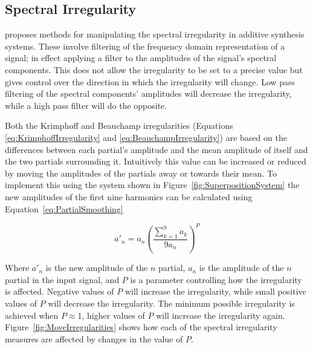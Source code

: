 	\subsection{Spectral Irregularity}
	\label{sec:FeatureControl-Parameterisation-Irregularity}
		\citet{beauchamp2007analysis} proposes methods for manipulating the spectral irregularity in additive
		synthesis systems. These involve filtering of the frequency domain representation of a signal; in effect
		applying a filter to the amplitudes of the signal's spectral components. This does not allow the
		irregularity to be set to a precise value but gives control over the direction in which the irregularity
		will change. Low pass filtering of the spectral components' amplitudes will decrease the irregularity,
		while a high pass filter will do the opposite.
		
		Both the Krimphoff and Beauchamp irregularities (Equations \ref{eq:KrimphoffIrregularity} and
		\ref{eq:BeauchampIrregularity}) are based on the differences between each partial's amplitude and the mean
		amplitude of itself and the two partials surrounding it. Intuitively this value can be increased or reduced
		by moving the amplitudes of the partials away or towards their mean. To implement this using the system
		shown in Figure~\ref{fig:SuperpositionSystem} the new amplitudes of the first nine harmonics can be
		calculated using Equation~\ref{eq:PartialSmoothing}

		\begin{equation}
			a'_{n} = a_{n} \left( \frac{\sum_{k = 1}^{9} a_{k}}{9a_{n}} \right) ^{P}
			\label{eq:PartialSmoothing}
		\end{equation}

		Where $a'_{n}$ is the new amplitude of the $n$ partial, $a_{n}$ is the amplitude of the
		$n$ partial in the input signal, and $P$ is a parameter controlling how the irregularity is
		affected. Negative values of $P$ will increase the irregularity, while small positive values of $P$ will
		decrease the irregularity. The minimum possible irregularity is achieved when $P \approx 1$, higher values
		of $P$ will increase the irregularity again. Figure~\ref{fig:MoveIrregularities} shows how each of the
		spectral irregularity measures are affected by changes in the value of $P$.


